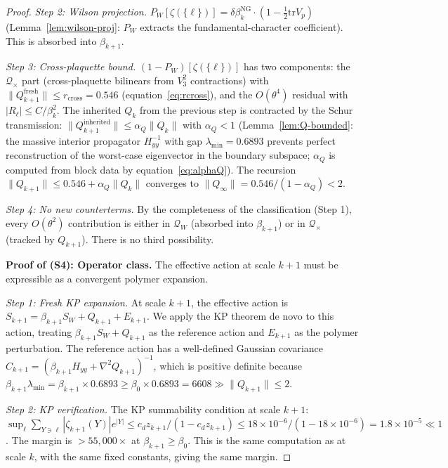 \documentclass[11pt]{article}
\theoremstyle{definition}
\newcommand{\tr}{\mathrm{tr}}
\begin{document}
\begin{proof}
\emph{Step 2: Wilson projection.}
$P_W[\zeta(\{\ell\})]=\delta\beta_k^{\mathrm{NG}}
\cdot(1-\frac{1}{2}\tr V_p)$
(Lemma~\ref{lem:wilson-proj}: $P_W$ extracts the
fundamental-character coefficient).  This is absorbed
into $\beta_{k+1}$.

\emph{Step 3: Cross-plaquette bound.}
$(1-P_W)[\zeta(\{\ell\})]$ has two components:
the $\mathcal{Q}_\times$ part (cross-plaquette bilinears
from $V_3^2$ contractions) with
$\|Q_{k+1}^{\mathrm{fresh}}\|\le r_{\mathrm{cross}}=0.546$
(equation~\eqref{eq:rcross}), and the $O(\theta^4)$
residual with $|R_\ell|\le C/\beta_k^2$.
The inherited $Q_k$ from the previous step is contracted
by the Schur transmission: $\|Q_{k+1}^{\mathrm{inherited}}\|
\le\alpha_Q\|Q_k\|$ with $\alpha_Q<1$
(Lemma~\ref{lem:Q-bounded}: the massive interior propagator
$H_{yy}^{-1}$ with gap $\lambda_{\min}=0.6893$ prevents
perfect reconstruction of the worst-case eigenvector
in the boundary subspace; $\alpha_Q$ is computed from
block data by equation~\eqref{eq:alphaQ}).
The recursion $\|Q_{k+1}\|\le 0.546+\alpha_Q\|Q_k\|$
converges to $\|Q_\infty\|=0.546/(1-\alpha_Q)<2$.

\emph{Step 4: No new counterterms.}
By the completeness of the classification (Step 1),
every $O(\theta^2)$ contribution is either in
$\mathcal{Q}_W$ (absorbed into $\beta_{k+1}$) or in
$\mathcal{Q}_\times$ (tracked by $Q_{k+1}$).
There is no third possibility.

\medskip\noindent\textbf{Proof of (S4): Operator class.}
The effective action at scale $k{+}1$ must be expressible
as a convergent polymer expansion.

\emph{Step 1: Fresh KP expansion.}
At scale $k{+}1$, the effective action is
$S_{k+1}=\beta_{k+1}S_W+Q_{k+1}+E_{k+1}$.
We apply the KP theorem de novo to this action,
treating $\beta_{k+1}S_W+Q_{k+1}$ as the reference action
and $E_{k+1}$ as the polymer perturbation.
The reference action has a well-defined Gaussian covariance
$C_{k+1}=(\beta_{k+1}H_{yy}+\nabla^2 Q_{k+1})^{-1}$,
which is positive definite because
$\beta_{k+1}\lambda_{\min}=\beta_{k+1}\times 0.6893
\ge\beta_0\times 0.6893=6608\gg\|Q_{k+1}\|\le 2$.

\emph{Step 2: KP verification.}
The KP summability condition at scale $k{+}1$:
$\sup_\ell\sum_{Y\ni\ell}|\zeta_{k+1}(Y)|e^{|Y|}
\le c_d z_{k+1}/(1-c_d z_{k+1})
\le 18\times 10^{-6}/(1-18\times 10^{-6})
=1.8\times 10^{-5}\ll 1$.
The margin is $>55{,}000\times$ at $\beta_{k+1}\ge\beta_0$.
This is the same computation as at scale $k$, with the
same fixed constants, giving the same margin.


\end{proof}
\end{document}
